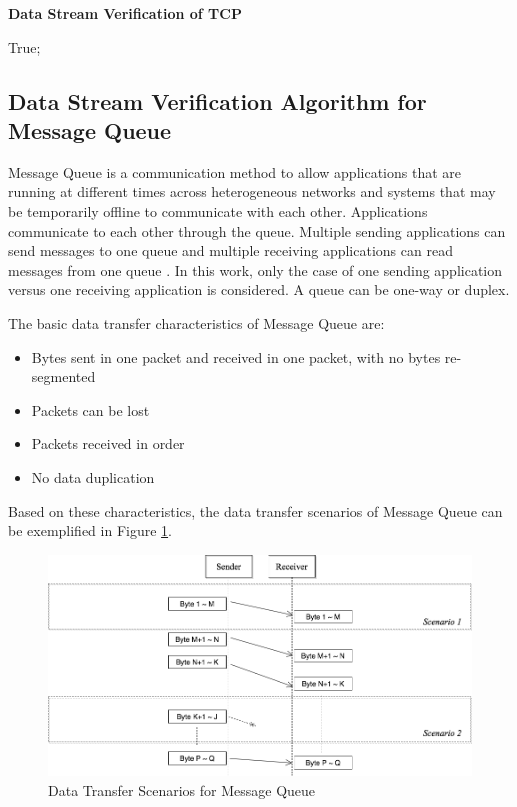 \begin{algorithm}[H]
\DontPrintSemicolon
\caption{{\bf Data Stream Verification of TCP} \label{dataAlg2}}
\;
 \KwRet True;\;
\end{algorithm} 



\subsection{Data Stream Verification Algorithm for Message Queue}
Message Queue is a communication method to allow applications that are running at different times across heterogeneous networks and systems that may be temporarily offline to communicate with each other. Applications communicate to each other through the queue. Multiple sending applications can send messages to one queue and multiple receiving applications can read messages from one queue \cite{redkar2004pro}. In this work, only the case of one sending application versus one receiving application is considered. A queue can be one-way or duplex.

The basic data transfer characteristics of Message Queue are:
\begin{itemize}
  \item Bytes sent in one packet and received in one packet, with no bytes re-segmented
  \item Packets can be lost
  \item Packets received in order
  \item No data duplication
\end{itemize}
Based on these characteristics, the data transfer scenarios of Message Queue can be exemplified in Figure \ref{msmq}.
\begin{figure}[H]
\centerline{\includegraphics[scale=0.4]{Figures/msmq}}
\caption{Data Transfer Scenarios for Message Queue}
\label{msmq}
\end{figure}

